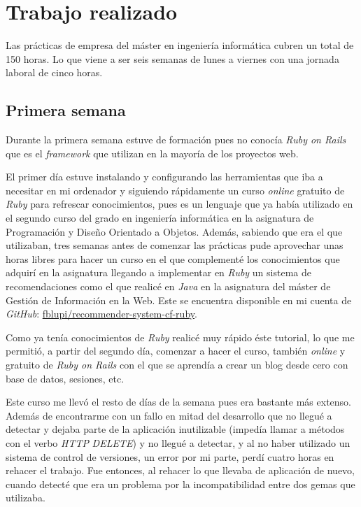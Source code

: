\chapter{Trabajo realizado}

Las prácticas de empresa del máster en ingeniería informática cubren un total de 150 horas. Lo que viene a ser seis semanas de lunes a viernes con una jornada laboral de cinco horas.

\section{Primera semana}

Durante la primera semana estuve de formación pues no conocía \textit{Ruby on Rails} que es el \textit{framework} que utilizan en la mayoría de los proyectos web.

El primer día estuve instalando y configurando las herramientas que iba a necesitar en mi ordenador y siguiendo rápidamente un curso \textit{online} gratuito de \textit{Ruby} para refrescar conocimientos, pues es un lenguaje que ya había utilizado en el segundo curso del grado en ingeniería informática en la asignatura de Programación y Diseño Orientado a Objetos. Además, sabiendo que era el que utilizaban, tres semanas antes de comenzar las prácticas pude aprovechar unas horas libres para hacer un curso en el que complementé los conocimientos que adquirí en la asignatura llegando a implementar en \textit{Ruby} un sistema de recomendaciones como el que realicé en \textit{Java} en la asignatura del máster de Gestión de Información en la Web. Este se encuentra disponible en mi cuenta de \textit{GitHub}: \href{https://github.com/fblupi/recommender-system-cf-ruby}{fblupi/recommender-system-cf-ruby}.

Como ya tenía conocimientos de \textit{Ruby} realicé muy rápido éste tutorial, lo que me permitió, a partir del segundo día, comenzar a hacer el curso, también \textit{online} y gratuito de \textit{Ruby on Rails} con el que se aprendía a crear un blog desde cero con base de datos, sesiones, etc.

Este curso me llevó el resto de días de la semana pues era bastante más extenso. Además de encontrarme con un fallo en mitad del desarrollo que no llegué a detectar y dejaba parte de la aplicación inutilizable (impedía llamar a métodos con el verbo \textit{HTTP} \textit{DELETE}) y no llegué a detectar, y al no haber utilizado un sistema de control de versiones, un error por mi parte, perdí cuatro horas en rehacer el trabajo. Fue entonces, al rehacer lo que llevaba de aplicación de nuevo, cuando detecté que era un problema por la incompatibilidad entre dos gemas que utilizaba.

